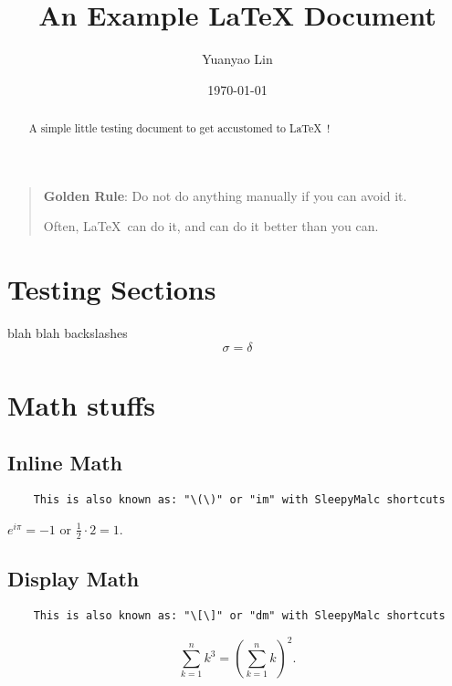 \documentclass[12pt]{article}
\theoremstyle{plain} %
\theoremstyle{definition}
\theoremstyle{remark}
\newcommand{\half}{\frac{1}{2}}
\begin{document}
\title{An Example LaTeX Document}
\author{Yuanyao Lin}
\date{\today}
\maketitle 

\begin{abstract}
    A simple little testing document to get accustomed to \LaTeX\ !
\end{abstract}

\tableofcontents

\eject

\begin{quote}
    \textbf{Golden Rule}: Do not do anything manually if you can avoid it.

    Often, \LaTeX\ can do it, and can do it better than you can.
\end{quote}

\section{Testing Sections}
blah blah backslashes 
\[
  \sigma = \delta
\]
\eject

\section{Math stuffs}
\subsection{Inline Math}
\begin{verbatim}
    This is also known as: "\(\)" or "im" with SleepyMalc shortcuts
\end{verbatim}

$e^{i \pi} = -1$ or $\half \cdot 2 = 1$.
\subsection{Display Math}
\begin{verbatim}
    This is also known as: "\[\]" or "dm" with SleepyMalc shortcuts
\end{verbatim}
\[
    \sum_{k=1}^n k^3 = \left( \sum_{k=1}^n k \right)^2.
\]

\eject
\end{document}
